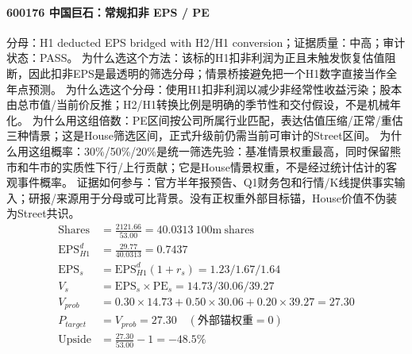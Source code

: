 \paragraph{600176 中国巨石：常规扣非 EPS / PE}
分母：H1 deducted EPS bridged with H2/H1 conversion；证据质量：中高；审计状态：PASS。
为什么选这个方法：该标的H1扣非利润为正且未触发恢复估值阻断，因此扣非EPS是最透明的筛选分母；情景桥接避免把一个H1数字直接当作全年点预测。
为什么选这个分母：使用H1扣非利润以减少非经常性收益污染；股本由总市值/当前价反推；H2/H1转换比例是明确的季节性和交付假设，不是机械年化。
为什么用这组倍数：PE区间按公司所属行业匹配，表达估值压缩/正常/重估三种情景；这是House筛选区间，正式升级前仍需当前可审计的Street区间。
为什么用这组概率：30\%/50\%/20\%是统一筛选先验：基准情景权重最高，同时保留熊市和牛市的实质性下行/上行贡献；它是House情景权重，不是经过统计估计的客观事件概率。
证据如何参与：官方半年报预告、Q1财务包和行情/K线提供事实输入；研报/来源用于分母或可比背景。没有正权重外部目标锚，House价值不伪装为Street共识。
\begin{align*}
\mathrm{Shares} &= \frac{2121.66}{53.00}=40.0313\ \mathrm{100m\ shares}\\
\mathrm{EPS}_{H1}^d &= \frac{29.77}{40.0313}=0.7437\\
\mathrm{EPS}_s &= \mathrm{EPS}_{H1}^d(1+r_s)=1.23/1.67/1.64\\
V_s &= \mathrm{EPS}_s\times \mathrm{PE}_s=14.73/30.06/39.27\\
V_{prob} &= 0.30\times 14.73+0.50\times 30.06+0.20\times 39.27=27.30\\
P_{target} &= V_{prob}=27.30\quad(\text{外部锚权重}=0)\\
\mathrm{Upside} &= \frac{27.30}{53.00}-1=-48.5\%\\
\end{align*}

